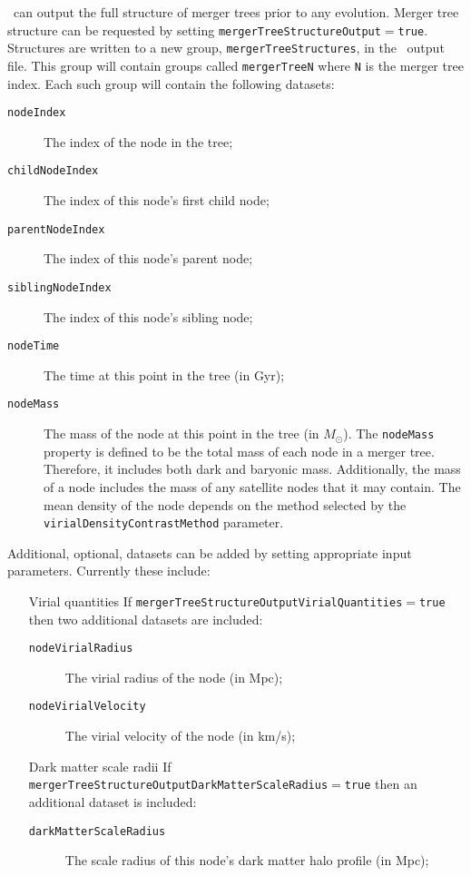 \glc\ can output the full structure of merger trees prior to any evolution. Merger tree structure can be requested by setting {\tt mergerTreeStructureOutput}$=${\tt true}. Structures are written to a new group, {\tt mergerTreeStructures}, in the \glc\ output file. This group will contain groups called {\tt mergerTreeN} where {\tt N} is the merger tree index. Each such group will contain the following datasets:
\begin{description}
 \item [{\tt nodeIndex}] The index of the node in the tree;
 \item [{\tt childNodeIndex}] The index of this node's first child node;
 \item [{\tt parentNodeIndex}] The index of this node's parent node;
 \item [{\tt siblingNodeIndex}] The index of this node's sibling node;
 \item [{\tt nodeTime}] The time at this point in the tree (in Gyr);
 \item [{\tt nodeMass}] The mass of the node at this point in the tree (in $M_\odot$). The {\tt nodeMass} property is defined to be the total mass of each node in a merger tree. Therefore, it includes both dark and baryonic mass. Additionally, the mass of a node includes the mass of any satellite nodes that it may contain. The mean density of the node depends on the method selected by the {\tt virialDensityContrastMethod} parameter.
\end{description}
Additional, optional, datasets can be added by setting appropriate input parameters. Currently these include:
\begin{itemize}
 \item [Virial quantities] If {\tt mergerTreeStructureOutputVirialQuantities}$=${\tt true} then two additional datasets are included:
 \begin{description}
  \item [{\tt nodeVirialRadius}] The virial radius of the node (in Mpc);
  \item [{\tt nodeVirialVelocity}] The virial velocity of the node (in km/s);
 \end{description}
 \item [Dark matter scale radii] If {\tt mergerTreeStructureOutputDarkMatterScaleRadius}$=${\tt true} then an additional dataset is included:
 \begin{description}
  \item [{\tt darkMatterScaleRadius}] The scale radius of this node's dark matter halo profile (in Mpc);
 \end{description}
\end{itemize}

